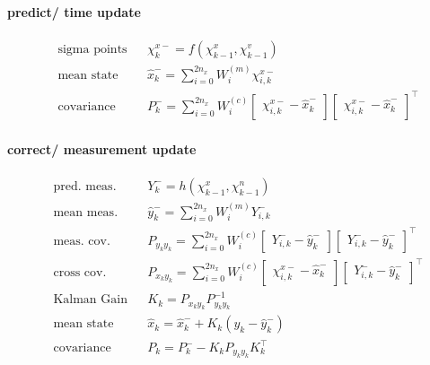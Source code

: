 \begin{multicols*}{2}
\paragraph{predict/ time update}

\begin{align}
&\text{sigma points} && \chi_{k}^{x-} = f(\chi_{k-1}^x, \chi_{k-1}^v) \\
&\text{mean state} && \hat{x}_{k}^- = \sum_{i=0}^{2n_x} W_i^{(m)} \chi_{i,k}^{x-} \\
&\text{covariance} && P_k^- = \sum_{i=0}^{2n_x} W_i^{(c)} \begin{bmatrix}\chi_{i,k}^{x-} - \hat{x}_{k}^-\end{bmatrix}\begin{bmatrix}\chi_{i,k}^{x-} - \hat{x}_{k}^-\end{bmatrix}^\top
\end{align}

\paragraph{correct/ measurement update}

\begin{align}
&\text{pred. meas.} && Y_k^- = h(\chi_{k-1}^x, \chi_{k-1}^n) \\
&\text{mean meas.} && \hat{y}_{k}^- = \sum_{i=0}^{2n_x} W_i^{(m)} Y_{i,k}^- \\
&\text{meas. cov.} && P_{y_k y_k} = \sum_{i=0}^{2n_x} W_i^{(c)} \begin{bmatrix}Y_{i,k}^- - \hat{y}_{k}^-\end{bmatrix} \begin{bmatrix}Y_{i,k}^- - \hat{y}_{k}^-\end{bmatrix}^\top \\
&\text{cross cov.} && P_{x_k y_k} = \sum_{i=0}^{2n_x} W_i^{(c)} \begin{bmatrix}\chi_{i,k}^{x-} - \hat{x}_{k}^-\end{bmatrix} \begin{bmatrix}Y_{i,k}^- - \hat{y}_{k}^-\end{bmatrix}^\top \\
&\text{Kalman Gain} && K_k = P_{x_k y_k} P_{y_k y_k}^{-1} \\
&\text{mean state} && \hat{x}_k = \hat{x}_k^- + K_k(y_k - \hat{y}_k^-) \\
&\text{covariance} && P_k = P_k^- - K_k P_{y_k y_k} K_k^\top
\end{align}


\end{multicols*}
